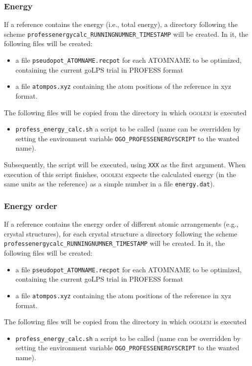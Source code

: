 \documentclass[a4paper,10pt]{scrbook}
\newcommand{\ogo}{\textsc{ogolem}}
\begin{document}
\subsubsection{Energy}
If a reference contains the energy (i.e., total energy), a directory following the scheme
\texttt{professenergycalc\_RUNNINGNUMNER\_TIMESTAMP} will be created. In it, the following files will be created:
\begin{itemize}
 \item a file \texttt{pseudopot\_ATOMNAME.recpot} for each ATOMNAME to be optimized,
 containing the current goLPS trial in PROFESS format
 \item a file \texttt{atompos.xyz} containing the atom positions of the reference in
 xyz format.
\end{itemize}
The following files will be copied from the directory in which \ogo{} is executed
\begin{itemize}
 \item \texttt{profess\_energy\_calc.sh} a script to be called (name can be overridden
 by setting the environment variable \texttt{OGO\_PROFESSENERGYSCRIPT} to the wanted
 name).
\end{itemize}

Subsequently, the script will be executed, using \texttt{XXX} as the first argument. When execution of
this script finishes, \ogo{} expects the calculated energy (in the same units as the reference) as
a simple number in a file \texttt{energy.dat}).

\subsubsection{Energy order}
If a reference contains the energy order of different atomic arrangements (e.g., crystal structures), for each crystal structure a directory following the scheme
\texttt{professenergycalc\_RUNNINGNUMNER\_TIMESTAMP} will be created. In it, the following files will be created:
\begin{itemize}
 \item a file \texttt{pseudopot\_ATOMNAME.recpot} for each ATOMNAME to be optimized,
 containing the current goLPS trial in PROFESS format
 \item a file \texttt{atompos.xyz} containing the atom positions of the reference in
 xyz format.
\end{itemize}
The following files will be copied from the directory in which \ogo{} is executed
\begin{itemize}
 \item \texttt{profess\_energy\_calc.sh} a script to be called (name can be overridden
 by setting the environment variable \texttt{OGO\_PROFESSENERGYSCRIPT} to the wanted
 name).
\end{itemize}
\end{document}

